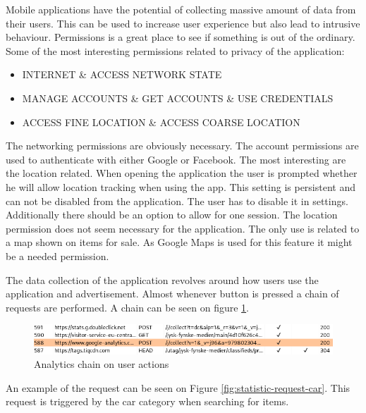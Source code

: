 Mobile applications have the potential of collecting massive amount of data from their users. This can be used to increase user experience but also lead to intrusive behaviour. Permissions is a great place to see if something is out of the ordinary. Some of the most interesting permissions related to privacy of the application:  

\begin{itemize}
    \item INTERNET \& ACCESS NETWORK STATE
    \item MANAGE ACCOUNTS \& GET ACCOUNTS \& USE CREDENTIALS
    \item ACCESS FINE LOCATION \& ACCESS COARSE LOCATION
\end{itemize}

The networking permissions are obviously necessary. The account permissions are used to authenticate with either Google or Facebook. The most interesting are the location related. When opening the application the user is prompted whether he will allow location tracking when using the app. This setting is persistent and can not be disabled from the application. The user has to disable it in settings. Additionally there should be an option to allow for one session. The location permission does not seem necessary for the application. The only use is related to a map shown on items for sale. As Google Maps is used for this feature it might be a needed permission.

The data collection of the application revolves around how users use the application and advertisement. Almost whenever button is pressed a chain of requests are performed. A chain can be seen on figure \ref{fig:statistics-chain}. 

\begin{figure}[htbp]
    \centering
    \includegraphics[width=1\columnwidth]{../static-analysis/pictures/statistics_trackview_chain.png}
    \caption{Analytics chain on user actions}
    \label{fig:statistics-chain}
\end{figure}

An example of the request can be seen on Figure \ref{fig:statistic-request-car}. This request is triggered by the car category when searching for items.  

